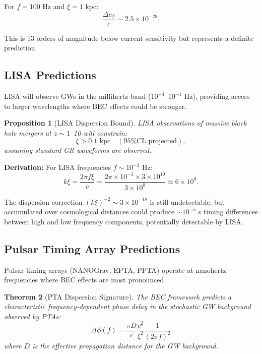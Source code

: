 \documentclass[11pt,a4paper]{article}
\newcommand{\cT}{\ensuremath{c_T}}
\newtheorem{theorem}{Theorem}[section]
\newtheorem{proposition}[theorem]{Proposition}
\theoremstyle{definition}
\theoremstyle{remark}
\begin{document}
For $f = 100$ Hz and $\xi = 1$ kpc:
\begin{equation}
\frac{\Delta \cT}{c} \sim 2.5 \times 10^{-28}.
\end{equation}

This is 13 orders of magnitude below current sensitivity but represents a definite prediction.

\subsection{LISA Predictions}
\label{sec:lisa}

LISA will observe GWs in the millihertz band ($10^{-4}$--$10^{-1}$ Hz), providing access to larger wavelengths where BEC effects could be stronger.

\begin{proposition}[LISA Dispersion Bound]
\label{prop:lisa_dispersion}
LISA observations of massive black hole mergers at $z \sim 1$--10 will constrain:
\begin{equation}
\xi > 0.1 \text{ kpc} \quad (\text{95\% CL projected}),
\end{equation}
assuming standard GR waveforms are observed.
\end{proposition}

\textbf{Derivation:} For LISA frequencies $f \sim 10^{-3}$ Hz:
\begin{equation}
k\xi = \frac{2\pi f \xi}{c} = \frac{2\pi \times 10^{-3} \times 3 \times 10^{19}}{3 \times 10^8} \approx 6 \times 10^{8}.
\end{equation}

The dispersion correction $(k\xi)^{-2} \sim 3 \times 10^{-18}$ is still undetectable, but accumulated over cosmological distances could produce $\sim 10^{-5}$ s timing differences between high and low frequency components, potentially detectable by LISA.

\subsection{Pulsar Timing Array Predictions}
\label{sec:pta}

Pulsar timing arrays (NANOGrav, EPTA, PPTA) operate at nanohertz frequencies where BEC effects are most pronounced.

\begin{theorem}[PTA Dispersion Signature]
\label{thm:pta_signature}
The BEC framework predicts a characteristic frequency-dependent phase delay in the stochastic GW background observed by PTAs:
\begin{equation}
\label{eq:pta_phase}
\boxed{\Delta\phi(f) = \frac{\pi D}{c}\frac{c^2}{\xi^2}\frac{1}{(2\pi f)^2}}
\end{equation}
where $D$ is the effective propagation distance for the GW background.
\end{theorem}
\end{document}
